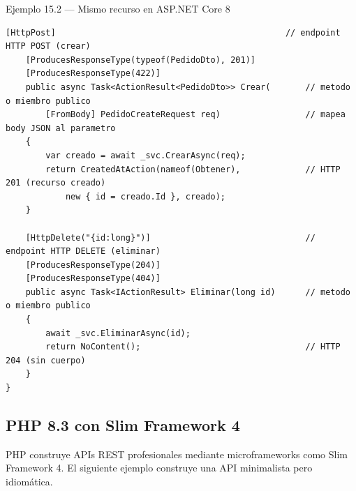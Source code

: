 \documentclass[11pt,a4paper,openany]{book}
\begin{document}
\begin{cajaejemplo}{Ejemplo 15.2 --- Mismo recurso en ASP.NET Core 8}
\begin{lstlisting}[style=cs,caption={PedidosController.cs},label=lst:15.4]
    [HttpPost]                                              // endpoint HTTP POST (crear)
    [ProducesResponseType(typeof(PedidoDto), 201)]
    [ProducesResponseType(422)]
    public async Task<ActionResult<PedidoDto>> Crear(       // metodo o miembro publico
        [FromBody] PedidoCreateRequest req)                 // mapea body JSON al parametro
    {
        var creado = await _svc.CrearAsync(req);
        return CreatedAtAction(nameof(Obtener),             // HTTP 201 (recurso creado)
            new { id = creado.Id }, creado);
    }

    [HttpDelete("{id:long}")]                               // endpoint HTTP DELETE (eliminar)
    [ProducesResponseType(204)]
    [ProducesResponseType(404)]
    public async Task<IActionResult> Eliminar(long id)      // metodo o miembro publico
    {
        await _svc.EliminarAsync(id);
        return NoContent();                                 // HTTP 204 (sin cuerpo)
    }
}
\end{lstlisting}
\end{cajaejemplo}

\subsection{PHP 8.3 con Slim Framework 4}

PHP construye APIs REST profesionales mediante microframeworks
como Slim Framework 4. El siguiente ejemplo construye una API
minimalista pero idiomática.
\end{document}
